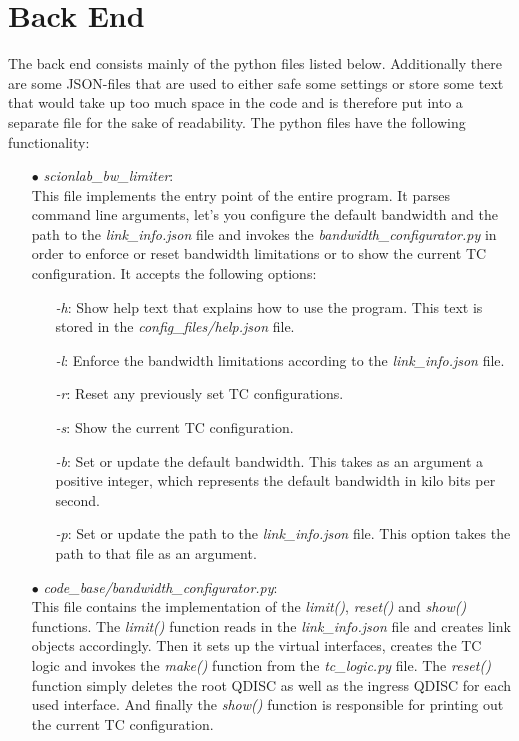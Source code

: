 \section{Back End}

The back end consists mainly of the python files listed below. Additionally there are some \acs{JSON}-files that are used to either safe some settings or store some text that would take up too much space in the code and is therefore put into a separate file for the sake of readability. The python files have the following functionality:

\begin{enumerate}
\item[$\bullet$]\textit{scionlab\_bw\_limiter}:
\\
This file implements the entry point of the entire program. It parses command line arguments, let's you configure the default bandwidth and the path to the \textit{link\_info.json} file and invokes the \textit{bandwidth\_configurator.py} in order to enforce or reset bandwidth limitations or to show the current \acs{TC} configuration. It accepts the following options:
	\begin{enumerate}
	\item[\textit{-h}:] Show help text that explains how to use the program. This text is stored in the \textit{config\_files/help.json} file.
	\item[\textit{-l}:] Enforce the bandwidth limitations according to the \textit{link\_info.json} file.
	\item[\textit{-r}:] Reset any previously set \acs{TC} configurations.
	\item[\textit{-s}:] Show the current \acs{TC} configuration.
	\item[\textit{-b}:] Set or update the default bandwidth. This takes as an argument a positive integer, which represents the default bandwidth in kilo bits per second.
	\item[\textit{-p}:] Set or update the path to the \textit{link\_info.json} file. This option takes the path to that file as an argument.
	\end{enumerate}

\item[$\bullet$]\textit{code\_base/bandwidth\_configurator.py}:
\\
This file contains the implementation of the \textit{limit()}, \textit{reset()} and \textit{show()} functions. The \textit{limit()} function reads in the \textit{link\_info.json} file and creates link objects accordingly. Then it sets up the virtual interfaces, creates the \acs{TC} logic and invokes the \textit{make()} function from the \textit{tc\_logic.py} file. The \textit{reset()} function simply deletes the root \acs{QDISC} as well as the ingress \acs{QDISC} for each used interface. And finally the \textit{show()} function is responsible for printing out the current \acs{TC} configuration.


\end{enumerate}
